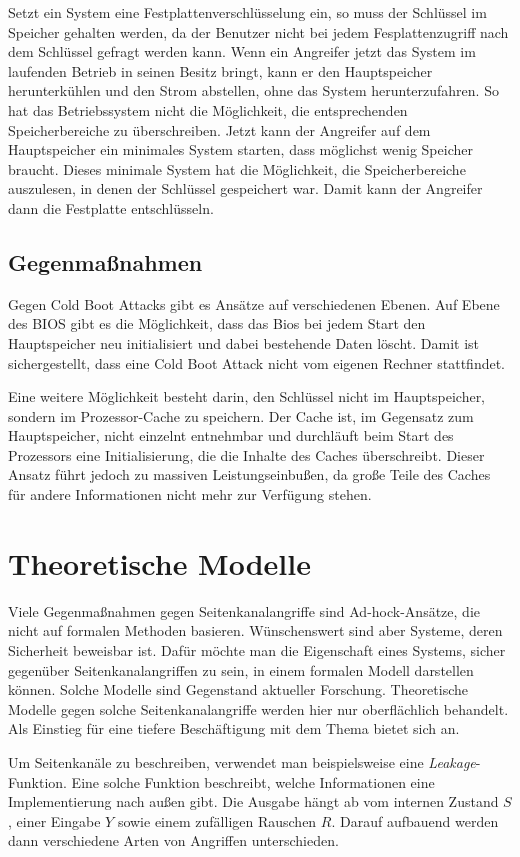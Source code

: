 Setzt ein System eine Festplattenverschlüsselung ein, so muss der
Schlüssel im Speicher gehalten werden, da der Benutzer nicht bei jedem
Fesplattenzugriff nach dem Schlüssel gefragt werden kann. Wenn ein
Angreifer jetzt das System im laufenden Betrieb in seinen Besitz bringt,
kann er den Hauptspeicher herunterkühlen und den Strom abstellen, ohne
das System herunterzufahren. So hat das Betriebssystem nicht die
Möglichkeit, die entsprechenden Speicherbereiche zu überschreiben. Jetzt
kann der Angreifer auf dem Hauptspeicher ein minimales System starten,
dass möglichst wenig Speicher braucht. Dieses minimale System hat die
Möglichkeit, die Speicherbereiche auszulesen, in denen der Schlüssel
gespeichert war. Damit kann der Angreifer dann die Festplatte
entschlüsseln.

\subsection{Gegenmaßnahmen}
Gegen Cold Boot Attacks gibt es Ansätze auf verschiedenen Ebenen. Auf
Ebene des BIOS gibt es die Möglichkeit, dass das Bios bei jedem Start
den Hauptspeicher neu initialisiert und dabei bestehende Daten
löscht. Damit ist sichergestellt, dass eine Cold Boot Attack nicht vom
eigenen Rechner stattfindet.

Eine weitere Möglichkeit besteht darin, den Schlüssel nicht im
Hauptspeicher, sondern im Prozessor-Cache zu speichern. Der Cache ist,
im Gegensatz zum Hauptspeicher, nicht einzelnt entnehmbar und durchläuft
beim Start des Prozessors eine Initialisierung, die die Inhalte des
Caches überschreibt. Dieser Ansatz führt jedoch zu massiven
Leistungseinbußen, da große Teile des Caches für andere Informationen
nicht mehr zur Verfügung stehen.
\section{Theoretische Modelle}
Viele Gegenmaßnahmen gegen Seitenkanalangriffe sind \glqq
Ad-hock\grqq-Ansätze, die nicht auf formalen Methoden
basieren. Wünschenswert sind aber Systeme, deren Sicherheit beweisbar
ist. Dafür möchte man die Eigenschaft eines Systems, sicher gegenüber
Seitenkanalangriffen zu sein, in einem formalen Modell darstellen
können. Solche Modelle sind Gegenstand aktueller Forschung. Theoretische
Modelle gegen solche Seitenkanalangriffe werden hier nur oberflächlich
behandelt. Als Einstieg für eine tiefere Beschäftigung mit dem Thema
bietet sich \cite{mol2010} an.

Um Seitenkanäle zu beschreiben, verwendet man beispielsweise eine
\emph{Leakage}-Funktion. Eine solche Funktion beschreibt, welche
Informationen eine Implementierung nach außen gibt. Die Ausgabe hängt ab
vom internen Zustand $S$, einer Eingabe $Y$ sowie einem zufälligen
Rauschen $R$. Darauf aufbauend werden dann verschiedene Arten von
Angriffen unterschieden. 
